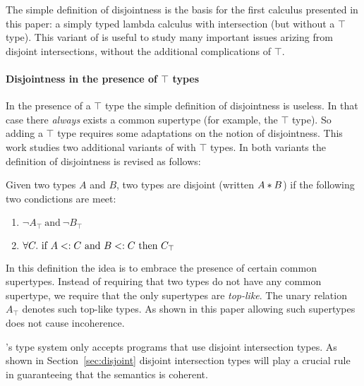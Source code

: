 The simple definition of disjointness is the basis for the first calculus 
presented in this paper: a simply typed lambda calculus with intersection 
(but without a $\top$ type). This variant of \name is useful to study many 
important issues arizing from disjoint intersections, without the additional 
complications of $\top$. 

\paragraph{Disjointness in the presence of $\top$ types} In the presence of a 
$\top$ type the simple definition of disjointness is useless. In that case there
\emph{always} exists a common supertype (for example, the $\top$ type). So
adding a $\top$ type requires some adaptations on the notion of disjointness. 
This work studies two additional variants of \name with $\top$ types. 
In both variants the definition of disjointness is revised as follows: 

\begin{definition}
  Given two types $A$ and $B$, two types are disjoint
  (written $A * B$) if the following two condictions are meet:
\begin{enumerate}
  \item $\neg A_{\top}~\text{and}~\neg B_{\top}$
  \item $\forall C.~\text{if}~ A <: C~\text{and}~B <: C~\text{then}~C_{\top}$
\end{enumerate}
\end{definition}

In this definition the idea is to embrace the presence of certain
common supertypes. Instead of requiring that two types do not have
any common supertype, we require that the only supertypes are
\emph{top-like}. The unary relation $A_{\top}$ denotes such top-like
types. As shown in this paper allowing such supertypes does not cause 
incoherence. 



 



\name's type system only accepts programs that use disjoint intersection
types. As shown in Section~\ref{sec:disjoint} disjoint intersection types will
play a crucial rule in guaranteeing that the semantics is coherent.


